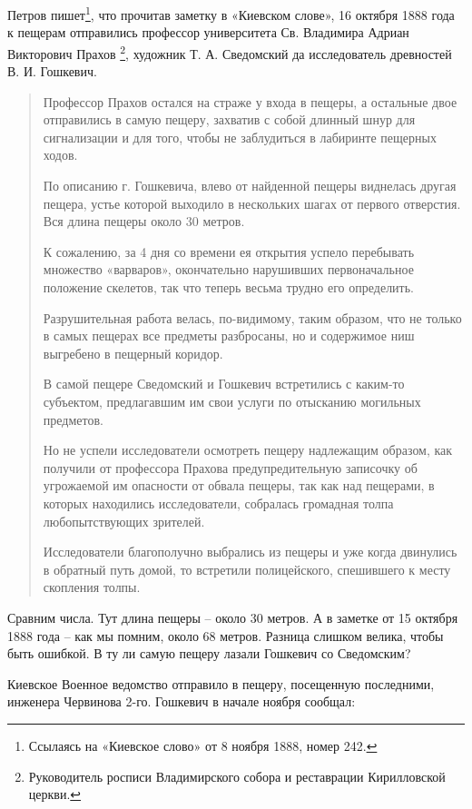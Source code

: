 Петров пишет\footnote{Ссылаясь на «Киевское слово» от 8 ноября 1888, номер 242.}, что прочитав заметку в «Киевском слове», 16 октября 1888 года к пещерам отправились профессор университета Св. Владимира Адриан Викторович Прахов
\footnote{Руководитель росписи Владимирского собора и реставрации Кирилловской церкви.}, художник Т. А. Сведомский да исследователь древностей В. И. Гошкевич.

\begin{quotation}
Профессор Прахов остался на страже у входа в пещеры, а остальные двое отправились в самую пещеру, захватив с собой длинный шнур для сигнализации и для того, чтобы не заблудиться в лабиринте пещерных ходов.

По описанию г. Гошкевича, влево от найденной пещеры виднелась другая пещера, устье которой выходило в нескольких шагах от первого отверстия. Вся длина пещеры около 30 метров. 

К сожалению, за 4 дня со времени ея открытия успело перебывать множество «варваров», окончательно нарушивших первоначальное положение скелетов, так что теперь весьма трудно его определить.

Разрушительная работа велась, по-видимому, таким образом, что не только в самых пещерах все предметы разбросаны, но и содержимое ниш выгребено в пещерный коридор.

В самой пещере Сведомский и Гошкевич встретились с каким-то субъектом, предлагавшим им свои услуги по отысканию могильных предметов.

Но не успели исследователи осмотреть пещеру надлежащим образом, как получили от профессора Прахова предупредительную записочку об угрожаемой им опасности от обвала пещеры, так как над пещерами, в которых находились исследователи, собралась громадная толпа любопытствующих зрителей.

Исследователи благополучно выбрались из пещеры и уже когда двинулись в обратный путь домой, то встретили полицейского, спешившего к месту скопления толпы.
\end{quotation}

Сравним числа. Тут длина пещеры – около 30 метров. А в заметке от 15 октября 1888 года – как мы помним, около 68 метров. Разница слишком велика, чтобы быть ошибкой. В ту ли самую пещеру лазали Гошкевич со Сведомским?

Киевское Военное ведомство отправило в пещеру, посещенную последними, инженера Червинова 2-го. Гошкевич в начале ноября сообщал:

